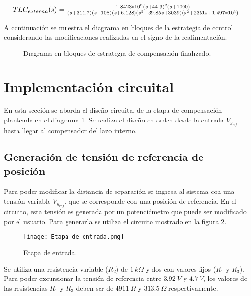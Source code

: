 \begin{equation*}
\resizebox{.99\hsize}{!}
{
$
TLC_{externa}(s)=\frac{1.8423*10^6 (s+44.3)^2 (s+1000)}{(s+311.7) (s+108) (s+6.128) (s^2 + 39.85s + 3039) (s^2 + 2351s + 1.497*10^6 )}
$
}
\end{equation*}

A continuación se muestra el diagrama en bloques de la estrategia de control considerando las modificaciones realizadas en el signo de la realimentación.

\begin{figure}[H]
	\centering
	\scalebox{0.8}{}
	\caption{Diagrama en bloques de estrategia de compensación finalizado.}	\label{fig:diag-en-bloques-comp_final}
\end{figure}

\section{Implementación circuital}

En esta sección se aborda el diseño circuital de la etapa de compensación planteada en el diagrama \ref{fig:diag-en-bloques-comp_final}. Se realiza el diseño en orden desde la entrada $V_{y_{ref}}$ hasta llegar al compensador del lazo interno.

\subsection{Generación de tensión de referencia de posición}

\noindent Para poder modificar la distancia de separación se ingresa al sistema con una tensión variable $V_{y_{ref}}$, que se corresponde con una posición de referencia. En el circuito, esta tensión es generada por un potenciómetro que puede ser modificado por el usuario. Para generarla se utiliza el circuito mostrado en la figura \ref{fig:etapa-de-entrada}.

\begin{figure}[H]
	\centering
	\texttt{[image: Etapa-de-entrada.png]}
	\caption{ Etapa de entrada.}
	\label{fig:etapa-de-entrada}
\end{figure}

Se utiliza una resistencia variable ($R_2$) de $1\:k\Omega$ y dos con valores fijos ($R_1$ y $R_3$). Para poder excursionar la tensión de referencia entre $3.92\:V$ y $4.7\:V$, los valores de las resistencias $R_1$ y $R_3$ deben ser de $4911\:\Omega$ y $313.5\:\Omega$ respectivamente. 

